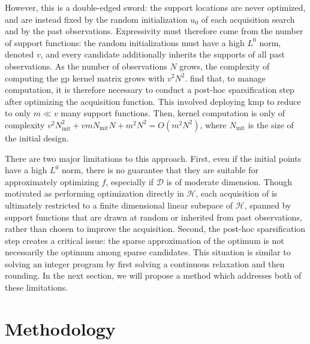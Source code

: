 \documentclass{article}
\newcommand{\D}{\mathcal{D}} %
\newcommand{\Hs}{\mathcal{H}}
\newcommand{\vu}{u}
\begin{document}
However, this is a double-edged sword: the support locations are never optimized, and are instead fixed by the random initialization $\vu_0$ of each acquisition search and by the past observations.
Expressivity must therefore come from the number of support functions: the random initializations must have a high $L^0$ norm, denoted $v$, and every candidate additionally inherits the supports of all past observations.
As the number of observations $N$ grows, the complexity of computing the \gls{gp} kernel matrix grows with $v^2N^2$.
\cite{vien2018bayesian} find that, to manage computation, it is therefore necessary to conduct a post-hoc sparsification step after optimizing the acquisition function.
This involved deploying \gls{kmp} \citep{vincent2002kernel} to reduce to only $m\ll v$ many support functions.
Then, kernel computation is only of complexity 
$v^2N_{\textrm{init}}^2 + v m N_{\textrm{init}}N + m^2N^2 = O(m^2N^2)$, where $N_{\textrm{init}}$ is the size of the initial design.

There are two major limitations to this approach.
First, even if the initial points have a high $L^0$ norm, there is no guarantee that they are suitable for approximately optimizing $f$, especially if $\D$ is of moderate dimension.
Though motivated as performing optimization directly in $\Hs$, each acquisition of \cite{vien2018bayesian} is ultimately restricted to a finite dimensional linear subspace of $\Hs$, spanned by support functions that are drawn at random or inherited from past observations, rather than chosen to improve the acquisition. 
Second, the post-hoc sparsification step creates a critical issue: the sparse approximation of the optimum is not necessarily the optimum among sparse candidates.
This situation is similar to solving an integer program by first solving a continuous relaxation and then rounding. 
In the next section, we will propose a method which addresses both of these limitations.

\section{Methodology}
\label{sec:methodology}


\end{document}
